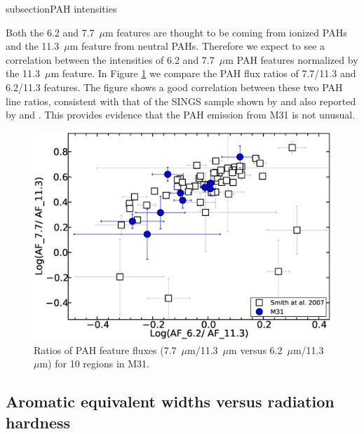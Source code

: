 subsection{PAH intensities}
\label{sect:pah_ratios}

Both the 6.2 and 7.7~$\mu$m features are thought to be coming from ionized PAHs and the 11.3~$\mu$m feature from neutral PAHs. Therefore we expect to see a correlation between the intensities of 6.2 and 7.7~$\mu$m PAH features normalized by the 11.3~$\mu$m feature. In Figure \ref{PAHlines} we compare the PAH flux ratios of 7.7/11.3  and 6.2/11.3 features. The figure shows a good correlation between these two PAH line ratios, consistent with that of the SINGS sample shown by \citet{Smith:2007lr} and
also reported by  \citet{Galliano2008} and \citet{Vermeij2002}. This provides evidence that the PAH emission from M31 is not unusual. 

\begin{figure}
\centering
\includegraphics[scale = 0.25]{./SINGSnMy.eps}
\caption{Ratios of PAH feature fluxes (7.7~$\mu$m/11.3~$\mu$m versus 6.2~$\mu$m/11.3~$\mu$m) for 10 regions in M31.}
\label{PAHlines}
\end{figure}

\subsection{Aromatic equivalent widths versus radiation hardness}
\label{sect:eqw_rh}


